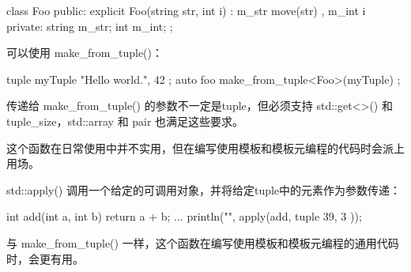 \begin{cpp}
class Foo
{
    public:
        explicit Foo(string str, int i) : m_str { move(str) }, m_int { i } { }
    private:
        string m_str;
        int m_int;
};
\end{cpp}

可以使用 make\_from\_tuple()：

\begin{cpp}
tuple myTuple { "Hello world.", 42 };
auto foo { make_from_tuple<Foo>(myTuple) };
\end{cpp}

传递给 make\_from\_tuple() 的参数不一定是tuple，但必须支持 std::get<>() 和 tuple\_size，std::array 和 pair 也满足这些要求。

这个函数在日常使用中并不实用，但在编写使用模板和模板元编程的代码时会派上用场。


std::apply() 调用一个给定的可调用对象，并将给定tuple中的元素作为参数传递：

\begin{cpp}
int add(int a, int b) { return a + b; }
...
println("{}", apply(add, tuple { 39, 3 }));
\end{cpp}

与 make\_from\_tuple() 一样，这个函数在编写使用模板和模板元编程的通用代码时，会更有用。







